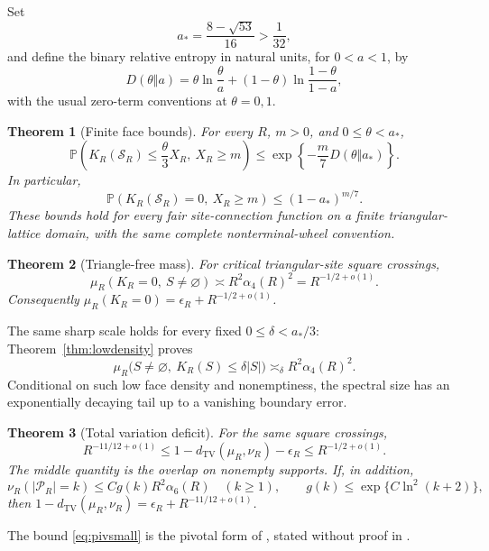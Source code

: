 \documentclass[11pt]{amsart}
\newtheorem{theorem}{Theorem}[section]
\theoremstyle{remark}
\newcommand{\Prob}{\mathbb P}
\newcommand{\cS}{\mathcal S}
\newcommand{\cP}{\mathcal P}
\newcommand{\TV}{d_{\mathrm{TV}}}
\newcommand{\astar}{a_*}
\begin{document}
Set
\begin{equation}\label{eq:astar}
 \astar=\frac{8-\sqrt{53}}{16}>\frac1{32},
\end{equation}
and define the binary relative entropy in natural units, for $0<a<1$, by
\[
 D(\theta\Vert a)=\theta\ln\frac{\theta}{a}
 +(1-\theta)\ln\frac{1-\theta}{1-a},
\]
with the usual zero-term conventions at $\theta=0,1$.

\begin{theorem}[Finite face bounds]\label{thm:finite}
For every $R$, $m>0$, and $0\le\theta<\astar$,
\begin{equation}\label{eq:density}
 \Prob\left(K_R(\cS_R)\le\frac{\theta}{3}X_R,\ X_R\ge m\right)
 \le\exp\left\{-\frac{m}{7}D(\theta\Vert\astar)\right\}.
\end{equation}
In particular,
\begin{equation}\label{eq:noface}
 \Prob(K_R(\cS_R)=0,\ X_R\ge m)\le(1-\astar)^{m/7}.
\end{equation}
These bounds hold for every fair site-connection function on a finite triangular-lattice domain, with the same complete nonterminal-wheel convention.
\end{theorem}

\begin{theorem}[Triangle-free mass]\label{thm:rate}
For critical triangular-site square crossings,
\begin{equation}\label{eq:rate}
 \mu_R(K_R=0,\ S\ne\varnothing)
 \asymp R^2\alpha_4(R)^2=R^{-1/2+o(1)}.
\end{equation}
Consequently $\mu_R(K_R=0)=\epsilon_R+R^{-1/2+o(1)}$.
\end{theorem}

The same sharp scale holds for every fixed $0\le\delta<\astar/3$: Theorem~\ref{thm:lowdensity} proves
\[
 \mu_R\bigl(S\ne\varnothing,\ K_R(S)\le\delta|S|\bigr)
 \asymp_\delta R^2\alpha_4(R)^2.
\]
Conditional on such low face density and nonemptiness, the spectral size has an exponentially decaying tail up to a vanishing boundary error.

\begin{theorem}[Total variation deficit]\label{thm:TVrate}
For the same square crossings,
\[
 R^{-11/12+o(1)}\le 1-\TV(\mu_R,\nu_R)-\epsilon_R\le R^{-1/2+o(1)}.
\]
The middle quantity is the overlap on nonempty supports. If, in addition,
\begin{equation}\label{eq:pivsmall}
 \nu_R(|\cP_R|=k)\le Cg(k)R^2\alpha_6(R)\quad(k\ge1),
 \qquad g(k)\le\exp\{C\ln^2(k+2)\},
\end{equation}
then $1-\TV(\mu_R,\nu_R)=\epsilon_R+R^{-11/12+o(1)}$.
\end{theorem}
The bound \eqref{eq:pivsmall} is the pivotal form of \cite[Proposition~4.1]{GPS}, stated without proof in \cite[Remarks~1.7 and~4.6]{GPS}.
\end{document}
